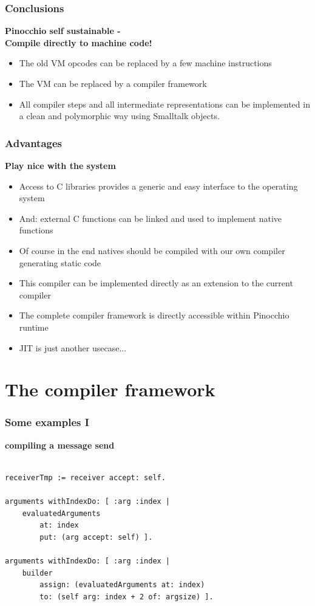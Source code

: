 \documentclass{beamer}
\begin{document}
\begin{frame}[fragile]
    \frametitle{Conclusions}
    {\bf Pinocchio self sustainable - \\Compile directly to machine code!}
    \begin{itemize}
        \item The old VM opcodes can be replaced by a few machine instructions
        \item The VM can be replaced by a compiler framework
        \item All compiler steps and all intermediate representations can 
            be implemented in a clean and polymorphic way using Smalltalk objects.
    \end{itemize}
\end{frame}

\begin{frame}[fragile]
    \frametitle{Advantages}
    {\bf Play nice with the system}
    \begin{itemize}
        \item Access to C libraries provides a generic and easy interface to the operating system
        \item And: external C functions can be linked and used to implement native functions
        \item Of course in the end natives should be compiled with our own 
                compiler generating static code
        \item This compiler can be implemented directly as an extension to the current compiler
        \item The complete compiler framework is directly accessible within Pinocchio runtime
        \item JIT is just another usecase...
    \end{itemize}
\end{frame}

\section{The compiler framework}

\lstset{language=Smalltalk}

\begin{frame}[fragile]
    \frametitle{Some examples I}
    {\bf compiling a message send}
    \begin{lstlisting}

receiverTmp := receiver accept: self.
    
arguments withIndexDo: [ :arg :index |
    evaluatedArguments 
        at: index 
        put: (arg accept: self) ].
    
arguments withIndexDo: [ :arg :index |
    builder
        assign: (evaluatedArguments at: index)
        to: (self arg: index + 2 of: argsize) ].
    \end{lstlisting}
\end{frame}
\end{document}
